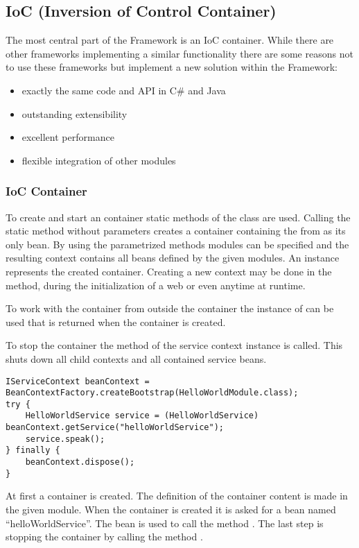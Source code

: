 \subsection{IoC (Inversion of Control Container)}
The most central part of the \AMBETH{} Framework is an IoC container. While there are other frameworks implementing a similar functionality there are some reasons not to use these frameworks but implement a new solution within the \AMBETH{} Framework:

\begin{itemize}
	\item exactly the same code and API in C\# and Java
	\item outstanding extensibility
	\item excellent performance
	\item flexible integration of other \AMBETH{} modules
\end{itemize}

\subsubsection{IoC Container}
\TODO

To create and start an \AMBETH{} container static methods of the class  are used. Calling the static method  without parameters creates a container containing the  from \AMBETH{} as its only bean. By using the parametrized methods modules can be specified and the resulting context contains all beans defined by the given modules. An instance  represents the created container.
Creating a new context may be done in the  method, during the initialization of a web  or even anytime at runtime.

To work with the container from outside the container the instance of  can be used that is returned when the container is created.

To stop the \AMBETH{} container the method  of the service context instance is called. This shuts down all child contexts and all contained service beans.


\begin{lstlisting}[style=Java,caption={Hoe to start, use and stop an \AMBETH{} Bean Container}]
IServiceContext beanContext = BeanContextFactory.createBootstrap(HelloWorldModule.class);
try {
	HelloWorldService service = (HelloWorldService) beanContext.getService("helloWorldService");
	service.speak();
} finally {
	beanContext.dispose();
}
\end{lstlisting}
At first a container is created. The definition of the container content is made in the given module. When the container is created it is asked for a bean named ``helloWorldService''. The bean is used to call the method . The last step is stopping the container by calling the method .

